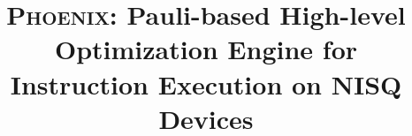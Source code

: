 \documentclass[conference,9pt]{IEEEtran}
\newcommand{\phoenix}{\textsc{Phoenix}}
\begin{document}

\title{\phoenix: Pauli-based High-level Optimization Engine for Instruction Execution on NISQ Devices}

\end{document}
